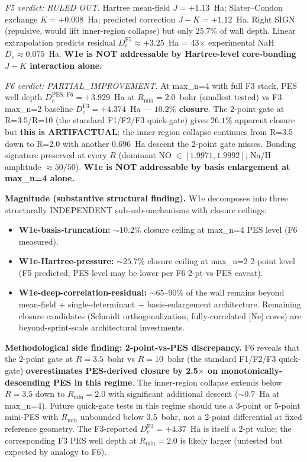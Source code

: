 \documentclass[11pt]{article}
\begin{document}
\emph{F5 verdict: RULED OUT.} Hartree mean-field $J = +1.13$~Ha;
Slater--Condon exchange $K = +0.008$~Ha; predicted correction
$J - K = +1.12$~Ha. Right SIGN (repulsive, would lift inner-region
collapse) but only $25.7\%$ of wall depth. Linear extrapolation
predicts residual $D_e^\text{F5} \approx +3.25$~Ha = 43$\times$
experimental NaH $D_e \approx 0.075$~Ha. \textbf{W1e is NOT
addressable by Hartree-level core-bonding $J - K$ interaction
alone.}

\emph{F6 verdict: PARTIAL\_IMPROVEMENT.} At max\_n=4 with full
F3 stack, PES well depth $D_e^\text{PES, F6} = +3.929$~Ha at
$R_\text{min}=2.0$~bohr (smallest tested) vs F3 max\_n=2 baseline
$D_e^\text{F3} = +4.374$~Ha --- \textbf{$10.2\%$ closure}. The
2-point gate at R=3.5/R=10 (the standard F1/F2/F3 quick-gate) gives
$26.1\%$ apparent closure but \textbf{this is ARTIFACTUAL}: the
inner-region collapse continues from R=3.5 down to R=2.0 with another
$0.696$~Ha descent the 2-point gate misses. Bonding signature
preserved at every $R$ (dominant NO $\in [1.9971, 1.9992]$;
Na/H amplitude $\approx 50/50$). \textbf{W1e is NOT addressable by
basis enlargement at max\_n=4 alone.}

\textbf{Magnitude (substantive structural finding).} W1e decomposes
into three structurally INDEPENDENT sub-sub-mechanisms with
closure ceilings:
\begin{itemize}\setlength\itemsep{0pt}
\item \textbf{W1e-basis-truncation:} ${\sim}10.2\%$ closure ceiling
  at max\_n=4 PES level (F6 measured).
\item \textbf{W1e-Hartree-pressure:} ${\sim}25.7\%$ closure ceiling
  at max\_n=2 2-point level (F5 predicted; PES-level may be lower
  per F6 2-pt-vs-PES caveat).
\item \textbf{W1e-deep-correlation-residual:} ${\sim}65$--$90\%$ of
  the wall remains beyond mean-field + single-determinant +
  basis-enlargement architecture. Remaining closure candidates
  (Schmidt orthogonalization, fully-correlated [Ne] cores) are
  beyond-sprint-scale architectural investments.
\end{itemize}

\textbf{Methodological side finding: 2-point-vs-PES discrepancy.}
F6 reveals that the 2-point gate at $R = 3.5$~bohr vs $R = 10$~bohr
(the standard F1/F2/F3 quick-gate) \textbf{overestimates PES-derived
closure by 2.5$\times$ on monotonically-descending PES in this
regime}. The inner-region collapse extends below $R = 3.5$ down to
$R_\text{min} = 2.0$ with significant additional descent
(${\sim}0.7$~Ha at max\_n=4). Future quick-gate tests in this regime
should use a 3-point or 5-point mini-PES with $R_\text{min}$
unbounded below 3.5~bohr, not a 2-point differential at fixed
reference geometry. The F3-reported $D_e^\text{F3} = +4.37$~Ha is
itself a 2-pt value; the corresponding F3 PES well depth at
$R_\text{min} = 2.0$ is likely larger (untested but expected by
analogy to F6).
\end{document}
